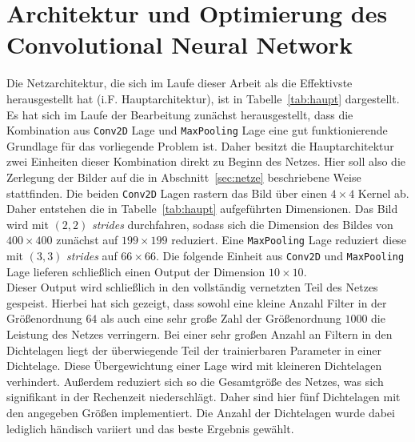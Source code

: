 {\let\clearpage\relax \renewcommand{\baselinestretch}{1.0}\chapter{
Architektur und Optimierung des Convolutional Neural Network}%
\renewcommand{\baselinestretch}{1.5}}%
%
Die Netzarchitektur, die sich im Laufe dieser Arbeit als die Effektivste
herausgestellt hat (i.F. Hauptarchitektur), ist in Tabelle~\ref{tab:haupt} dargestellt. Es hat
sich im Laufe der Bearbeitung zunächst herausgestellt, dass die Kombination
aus \texttt{Conv2D} Lage und \texttt{MaxPooling} Lage eine gut
funktionierende Grundlage für das vorliegende Problem ist.
Daher besitzt die Hauptarchitektur zwei Einheiten dieser Kombination
direkt zu Beginn des Netzes. Hier soll also die Zerlegung der Bilder auf
die in Abschnitt~\ref{sec:netze} beschriebene Weise stattfinden.
Die beiden \texttt{Conv2D} Lagen rastern das Bild über einen $4\times4$
Kernel ab. Daher entstehen die in Tabelle~\ref{tab:haupt} aufgeführten
Dimensionen. Das Bild wird mit $(2, 2)$ \textit{strides} durchfahren,
sodass sich die Dimension des Bildes von $400\times400$ zunächst auf
$199\times199$ reduziert. Eine \texttt{MaxPooling} Lage reduziert diese
mit $(3, 3)$ \textit{strides} auf $66\times66$. Die folgende Einheit
aus  \texttt{Conv2D} und \texttt{MaxPooling} Lage lieferen schließlich
einen Output der Dimension $10\times10$.\\
Dieser Output wird schließlich in den vollständig vernetzten Teil des
Netzes gespeist. Hierbei hat sich gezeigt, dass sowohl eine kleine Anzahl
Filter in der Größenordnung $64$ als auch eine sehr große Zahl der
Größenordnung $1000$ die Leistung des Netzes verringern. Bei einer sehr großen
Anzahl an Filtern in den Dichtelagen liegt der überwiegende Teil der
trainierbaren Parameter in einer Dichtelage. Diese Übergewichtung einer Lage
wird mit kleineren Dichtelagen verhindert. Außerdem reduziert sich so die
Gesamtgröße des Netzes, was sich signifikant in der Rechenzeit niederschlägt.
Daher sind hier fünf Dichtelagen mit den angegeben Größen implementiert.
Die Anzahl der Dichtelagen wurde dabei lediglich händisch variiert und das
beste Ergebnis gewählt.
%
\renewcommand{\baselinestretch}{1.0}
